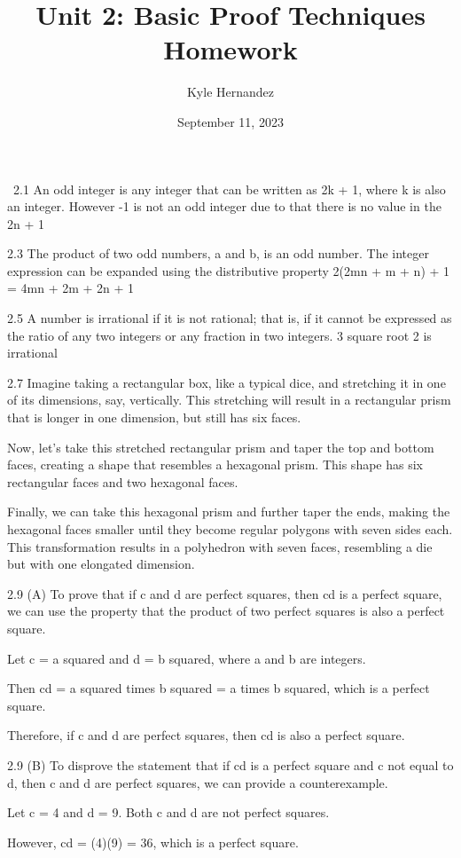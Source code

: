 \documentclass{article}
\title{Unit 2: Basic Proof Techniques Homework}
\author{Kyle Hernandez}
\date{September 11, 2023}
\begin{document}
\maketitle
\
2.1  An odd integer is any integer that can be written as 2k + 1, where k is also an integer. However  -1 is not an odd integer due to that there is no value in the 2n + 1



2.3  The product of two odd numbers, a and b, is an odd number. The integer expression can be expanded using the distributive property 2(2mn + m + n) + 1 =  4mn + 2m + 2n + 1 


2.5  A number is irrational if it is not rational; that is, if it cannot be expressed as the ratio of any two integers or any fraction in two integers. 3 square root 2 is irrational 


2.7 Imagine taking a rectangular box, like a typical dice, and stretching it in one of its dimensions, say, vertically. This stretching will result in a rectangular prism that is longer in one dimension, but still has six faces.

Now, let's take this stretched rectangular prism and taper the top and bottom faces, creating a shape that resembles a hexagonal prism. This shape has six rectangular faces and two hexagonal faces.

Finally, we can take this hexagonal prism and further taper the ends, making the hexagonal faces smaller until they become regular polygons with seven sides each. This transformation results in a polyhedron with seven faces, resembling a die but with one elongated dimension.

2.9 (A) To prove that if c and d are perfect squares, then cd is a perfect square, we can use the property that the product of two perfect squares is also a perfect square.

Let c = a squared and d = b squared, where a and b are integers.

Then cd = a squared times b squared  = a times b squared, which is a perfect square.

Therefore, if c and d are perfect squares, then cd is also a perfect square.




2.9 (B) To disprove the statement that if cd is a perfect square and c not equal to d, then c and d are perfect squares, we can provide a counterexample.

Let c = 4 and d = 9. Both c and d are not perfect squares.

However, cd = (4)(9) = 36, which is a perfect square.
\end{document}
